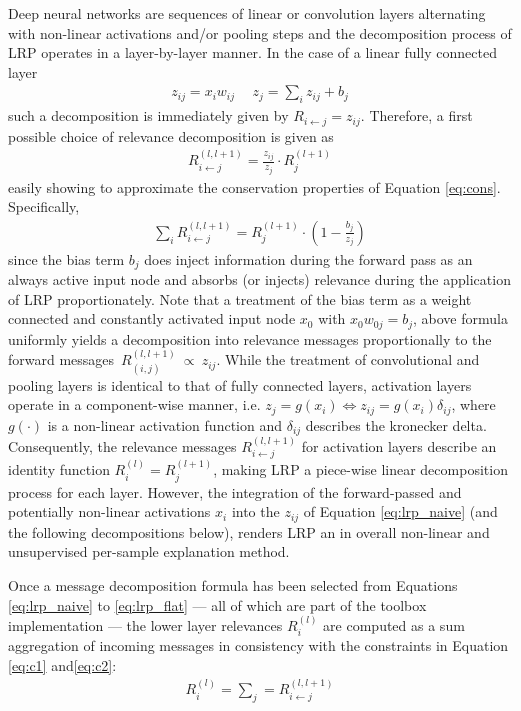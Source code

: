 \documentclass[a4wide]{article}
\begin{document}
Deep neural networks are sequences of linear or convolution layers alternating with non-linear activations and/or pooling steps and the decomposition process of LRP operates in a layer-by-layer manner.
In the case of a linear fully connected layer
\begin{align}
z_{ij} = x_iw_{ij} ~&~ z_j = \sum\limits_i z_{ij} + b_j
\end{align}
such a decomposition is immediately given by $R_{i\leftarrow j} = z_{ij}$.
Therefore, a first possible choice of  relevance decomposition is given as
\begin{align}
R^{(l,l+1)}_{i\leftarrow j} = \frac{z_{ij}}{z_j}\cdot R_j^{(l+1)}
\label{eq:lrp_naive}
\end{align}
easily showing to approximate the conservation properties of Equation \ref{eq:cons}. Specifically,
\begin{align}
\sum\limits_i R^{(l,l+1)}_{i\leftarrow j} = R_j^{(l+1)} \cdot (1 - \frac{b_j}{z_j})
\end{align}
since the bias term $b_j$ does inject information during the forward pass as an always active input node and absorbs (or injects) relevance during the application of LRP proportionately. Note that a treatment of the bias term as a weight connected and constantly activated input node  $x_0$ with $x_0w_{0j}=b_j$, above formula uniformly yields a decomposition into relevance messages proportionally to the forward messages~$R_{(i,j)}^{(l,l+1)}~\propto~z_{ij}$.
While the treatment of convolutional and pooling layers is identical to that of fully connected layers, activation layers operate in a component-wise manner, i.e. $z_{j} = g(x_i) \Leftrightarrow z_{ij}  = g(x_i)\delta_{ij}$, where $g(\cdot)$ is a non-linear activation function and $\delta_{ij}$ describes the kronecker delta.
Consequently, the relevance messages $R^{(l,l+1)}_{i\leftarrow j}$ for activation layers describe an identity function $R^{(l)}_i = R^{(l+1)}_j$, making LRP a piece-wise linear decomposition process for each layer.
However, the integration of the forward-passed and potentially non-linear activations $x_i$ into the $z_{ij}$ of Equation \ref{eq:lrp_naive} (and the following decompositions below), renders LRP an in overall non-linear and unsupervised per-sample explanation method.

Once a message decomposition formula has been selected from Equations \ref{eq:lrp_naive} to \ref{eq:lrp_flat} --- all of which are part of the toolbox implementation --- the lower layer relevances $R^{(l)}_i$ are computed as a sum aggregation of incoming messages in consistency with the constraints in Equation \ref{eq:c1} and\ref{eq:c2}:
\begin{align}
R_i^{(l)} = \sum\limits_j = R^{(l,l+1)}_{i \leftarrow j}
\end{align}
\end{document}
